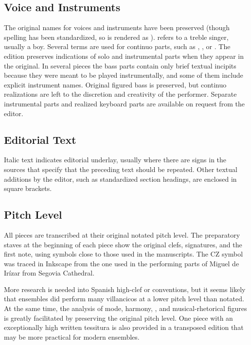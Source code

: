 \subsection{Voice and Instruments}
The original names for voices and instruments have been preserved (though
spelling has been standardized, so  is rendered as
).
 refers to a treble singer, usually a boy.
Several terms are used for continuo parts, such as ,
, or .
The edition preserves indications of solo and instrumental parts when they
appear in the original.
In several pieces the bass parts contain only brief textual incipits because
they were meant to be played instrumentally, and some of them include explicit
instrument names.
Original figured bass is preserved, but continuo realizations are left to the
discretion and creativity of the performer.
Separate instrumental parts and realized keyboard parts are available on request
from the editor.

\subsection{Editorial Text}
Italic text indicates editorial underlay, usually where there are signs in the
sources that specify that the preceding text should be repeated.
Other textual additions by the editor, such as standardized section headings, 
are enclosed in square brackets.

\subsection{Pitch Level}
All pieces are transcribed at their original notated pitch level.
The preparatory staves at the beginning of each piece show the original clefs, 
signatures, and the first note, using symbols close to those used in the
manuscripts.  
The CZ symbol was traced in Inkscape from the one used in the performing parts
of Miguel de Irízar from Segovia Cathedral.

More research is needed into Spanish high-clef or 
conventions, but it seems likely that ensembles did perform many villancicos
at a lower pitch level than notated.
At the same time, the analysis of mode, harmony, , and
musical-rhetorical figures is greatly facilitated by preserving the original
pitch level.
One piece with an exceptionally high written tessitura is also provided in a
transposed edition that may be more practical for modern ensembles.

